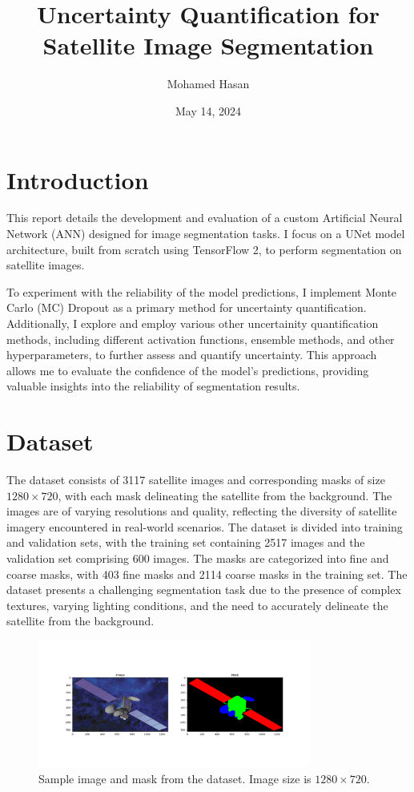 \documentclass{article}
\title{Uncertainty Quantification for Satellite Image Segmentation}
\author{Mohamed Hasan}
\date{May 14, 2024}
\begin{document}
\maketitle

\section{Introduction}


This report details the development and evaluation of a custom Artificial Neural Network (ANN) designed for image 
segmentation tasks. I focus on a UNet model architecture, built from scratch using TensorFlow 2, to perform segmentation 
on satellite images. 

To experiment with the reliability of the model predictions, I implement Monte Carlo (MC) Dropout as a 
primary method for uncertainty quantification. Additionally, I explore and employ various other uncertainity quantification 
methods, including 
different activation functions, ensemble methods, and other hyperparameters, to further assess and quantify uncertainty. 
This approach allows me to evaluate the confidence of the model’s predictions, providing valuable insights 
into the reliability of segmentation results.


\section{Dataset}
The dataset consists of 3117 satellite images and corresponding masks of size $1280 \times 720$, with each 
mask delineating the satellite from the background. The images are of varying resolutions and quality, 
reflecting the diversity of satellite imagery encountered in real-world scenarios. The dataset is divided 
into training and validation sets, with the training set containing 2517 images and the validation set
comprising 600 images. The masks are categorized into fine and coarse masks, with 403 fine masks
and 2114 coarse masks in the training set. The dataset presents a challenging segmentation task due
to the presence of complex textures, varying lighting conditions, and the need to accurately
delineate the satellite from the background.

\begin{figure}[h]
    \centering
    \includegraphics[width=0.8\textwidth]{../images/original_input_sample.png}
    \caption{Sample image and mask from the dataset. Image size is $1280 \times 720$.}
    \label{fig:original_dataset}
\end{figure}
\end{document}
